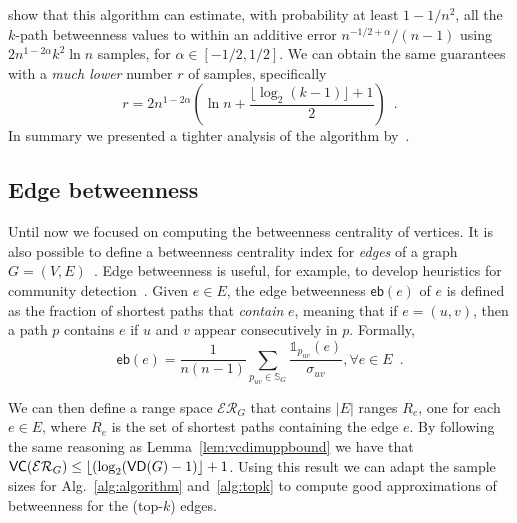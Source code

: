\citet{KourtellisASIT12} show that this algorithm can estimate, with probability
at least $1-1/n^2$, all the $k$-path betweenness values to within an additive
error $n^{-1/2+\alpha}/(n-1)$ using $2n^{1-2\alpha}k^2\ln n$ samples, for
$\alpha\in[-1/2,1/2]$. We can obtain the same guarantees with a \emph{much
lower} number $r$ of samples, specifically
\[
r=2n^{1-2\alpha}\left(\ln n+\frac{\lfloor\log_2(k-1)\rfloor+1}{2}\right)\enspace.
\]
In summary we presented a tighter analysis of the algorithm
by~\citet{KourtellisASIT12}.

\subsection{Edge betweenness}\label{sec:edgebetw}
Until now we focused on computing the betweenness centrality of vertices.
It is also possible to define a betweenness centrality index for \emph{edges} of
a graph $G=(V,E)$~\citep{Anthonisse71,Brandes08}. Edge betweenness is useful,
for example, to develop heuristics for community detection~\citep{NewmanG04}.
Given $e\in E$, the edge betweenness $\mathsf{eb}(e)$ of $e$ is defined as the
fraction of shortest paths that \emph{contain} $e$, meaning that if $e=(u,v)$,
then a path $p$ contains $e$ if $u$ and $v$ appear consecutively in $p$.
Formally,
\[
\mathsf{eb}(e)=\frac{1}{n(n-1)}\sum_{p_{uv}\in\mathbb{S}_G}\frac{\mathds{1}_{p_{uv}}(e)}{\sigma_{uv}}, \forall e\in E\enspace.
\]

We can then define a range space $\mathcal{ER}_G$ that contains $|E|$ ranges $R_e$, one
for each $e\in E$, where $R_e$ is the set of shortest paths containing the edge
$e$. By following the same reasoning as Lemma~\ref{lem:vcdimuppbound} we have that
$\mathsf{VC}(\mathcal{ER}_G)\le\lfloor(\log_2(\mathsf{VD}(G) - 1)\rfloor + 1$. Using this result we can
adapt the sample sizes for Alg.~\ref{alg:algorithm} and~\ref{alg:topk} to
compute good approximations of betweenness for the (top-$k$) edges.

\fi

